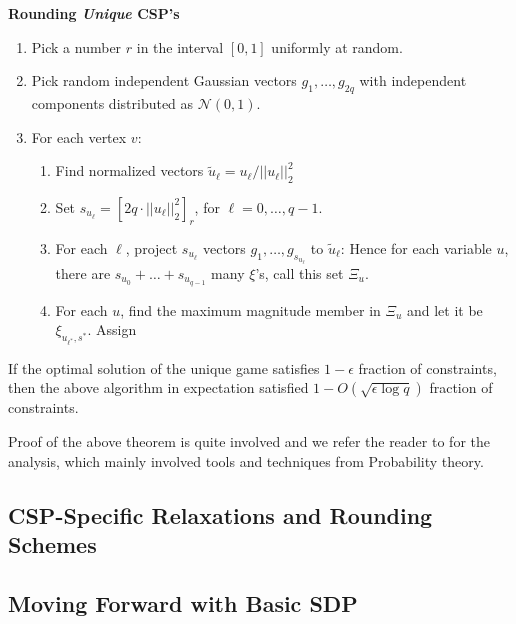 \begin{algorithm}\textbf{Rounding \textit{Unique} CSP's}
\begin{enumerate}
\item Pick a number $r$ in the interval $[0, 1]$ uniformly at random.
\item Pick random independent Gaussian vectors $g_1, \ldots, g_{2q}$ with independent components distributed as $\mathcal{N}(0, 1)$.
\item For each vertex $v$:
\begin{enumerate}
\item Find normalized vectors $\tilde{u}_{\ell} = {u_{\ell}}/{||u_\ell||_2^2}$
\item Set $s_{u_\ell} = [2q \cdot ||u_\ell||_2^2]_r$, for $\ell=0, \ldots, q-1$.
\item For each $\ell$, project $s_{u_\ell}$ vectors $g_1, \ldots, g_{s_{u_\ell}}$ to $\tilde{u}_\ell$:
Hence for each variable $u$, there are $s_{u_0}+\ldots+s_{u_{q-1}}$ many $\xi$'s, call this set $\Xi_u$.
\item For each $u$, find the maximum magnitude member in $\Xi_u$ and let it be $\xi_{u_{\ell^*}, s^*}$. Assign
\end{enumerate}
\end{enumerate}
\end{algorithm}
\begin{theorem}
If the optimal solution of the unique game satisfies $1-\epsilon$ fraction of constraints, then the above algorithm in expectation satisfied $1-O({\sqrt{\epsilon \log q }})$ fraction of constraints.
\end{theorem}
Proof of the above theorem is quite involved and we refer the reader to \cite{cmm06} for the analysis, which mainly involved tools and techniques from Probability theory.

\subsection{CSP-Specific Relaxations and Rounding Schemes}

\subsection{Moving Forward with Basic SDP}
